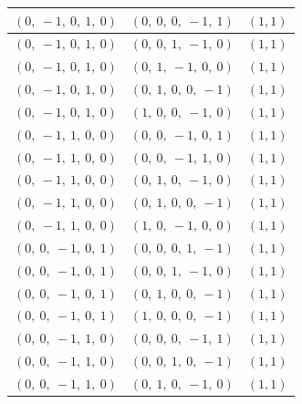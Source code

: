 \documentclass[11pt]{article}
\theoremstyle{definition}
\begin{document}
\begin{tabular}{|l|l|c|}
    \hline
    $\left( 0, \  -1, \  0, \  1, \  0\right)$ & $\left( 0, \  0, \  0, \  -1, \  1\right)$ & $(1,1)$ \\
    \hline
    $\left( 0, \  -1, \  0, \  1, \  0\right)$ & $\left( 0, \  0, \  1, \  -1, \  0\right)$ & $(1,1)$ \\
    \hline
    $\left( 0, \  -1, \  0, \  1, \  0\right)$ & $\left( 0, \  1, \  -1, \  0, \  0\right)$ & $(1,1)$ \\
    \hline
    $\left( 0, \  -1, \  0, \  1, \  0\right)$ & $\left( 0, \  1, \  0, \  0, \  -1\right)$ & $(1,1)$ \\
    \hline
    $\left( 0, \  -1, \  0, \  1, \  0\right)$ & $\left( 1, \  0, \  0, \  -1, \  0\right)$ & $(1,1)$ \\
    \hline
    $\left( 0, \  -1, \  1, \  0, \  0\right)$ & $\left( 0, \  0, \  -1, \  0, \  1\right)$ & $(1,1)$ \\
    \hline
    $\left( 0, \  -1, \  1, \  0, \  0\right)$ & $\left( 0, \  0, \  -1, \  1, \  0\right)$ & $(1,1)$ \\
    \hline
    $\left( 0, \  -1, \  1, \  0, \  0\right)$ & $\left( 0, \  1, \  0, \  -1, \  0\right)$ & $(1,1)$ \\
    \hline
    $\left( 0, \  -1, \  1, \  0, \  0\right)$ & $\left( 0, \  1, \  0, \  0, \  -1\right)$ & $(1,1)$ \\
    \hline
    $\left( 0, \  -1, \  1, \  0, \  0\right)$ & $\left( 1, \  0, \  -1, \  0, \  0\right)$ & $(1,1)$ \\
    \hline
    $\left( 0, \  0, \  -1, \  0, \  1\right)$ & $\left( 0, \  0, \  0, \  1, \  -1\right)$ & $(1,1)$ \\
    \hline
    $\left( 0, \  0, \  -1, \  0, \  1\right)$ & $\left( 0, \  0, \  1, \  -1, \  0\right)$ & $(1,1)$ \\
    \hline
    $\left( 0, \  0, \  -1, \  0, \  1\right)$ & $\left( 0, \  1, \  0, \  0, \  -1\right)$ & $(1,1)$ \\
    \hline
    $\left( 0, \  0, \  -1, \  0, \  1\right)$ & $\left( 1, \  0, \  0, \  0, \  -1\right)$ & $(1,1)$ \\
    \hline
    $\left( 0, \  0, \  -1, \  1, \  0\right)$ & $\left( 0, \  0, \  0, \  -1, \  1\right)$ & $(1,1)$ \\
    \hline
    $\left( 0, \  0, \  -1, \  1, \  0\right)$ & $\left( 0, \  0, \  1, \  0, \  -1\right)$ & $(1,1)$ \\
    \hline
    $\left( 0, \  0, \  -1, \  1, \  0\right)$ & $\left( 0, \  1, \  0, \  -1, \  0\right)$ & $(1,1)$ \\

\end{tabular}
\end{document}
